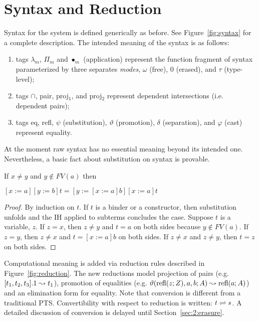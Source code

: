 \section{Syntax and Reduction}




Syntax for the system is defined generically as before.
See Figure~\ref{fig:syntax} for a complete description.
The intended meaning of the syntax is as follows:
\begin{enumerate}
    \item tags $\lambda_m$, $\Pi_m$ and $\bullet_m$ (application) represent the function fragment of syntax parameterized by three separates \textit{modes}, $\omega$ (free), $0$ (erased), and $\tau$ (type-level);
    \item tags $\cap$, pair, proj$_1$, and proj$_2$ represent dependent intersections (i.e. dependent pairs);
    \item tags eq, refl, $\psi$ (substitution), $\vartheta$ (promotion), $\delta$ (separation), and $\varphi$ (cast) represent equality.
\end{enumerate}
At the moment raw syntax has no essential meaning beyond its intended one.
Nevertheless, a basic fact about substitution on syntax is provable.

\begin{lemma}
    If $x \neq y$ and $y \notin FV(a)$ then \begin{tightcenter} $[x := a][y := b]t = [y := [x := a]b][x := a]t$ \end{tightcenter}
    \label{lem:2:subst_commute}
\end{lemma}
\begin{proof}
    By induction on $t$.
    If $t$ is a binder or a constructor, then substitution unfolds and the IH applied to subterms concludes the case.
    Suppose $t$ is a variable, $z$.
    If $z = x$, then $z \neq y$ and $t = a$ on both sides because $y \notin FV(a)$.
    If $z = y$, then $z \neq x$ and $t = [x := a]b$ on both sides.
    If $z \neq x$ and $z \neq y$, then $t = z$ on both sides.
\end{proof}

Computational meaning is added via reduction rules described in Figure~\ref{fig:reduction}.
The new reductions model projection of pairs (e.g. $[t_1, t_2, t_3].1 \leadsto t_1$), promotion of equalities (e.g. $\vartheta(\text{refl}(z; Z), a, b; A) \leadsto \text{refl}(a; A)$) and an elimination form for equality.
Note that conversion is different from a traditional PTS.
Convertibility with respect to reduction is written: $t \rightleftharpoons s$.
A detailed discussion of conversion is delayed until Section~\ref{sec:2:erasure}.

